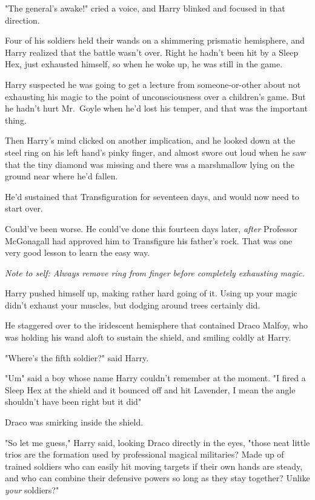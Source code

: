 "The general's awake!" cried a voice, and Harry blinked and focused in that
direction.

Four of his soldiers held their wands on a shimmering prismatic hemisphere, and
Harry realized that the battle wasn't over. Right{\el} he hadn't been hit by
a Sleep Hex, just exhausted himself, so when he woke up, he was still in the
game.

Harry suspected he was going to get a lecture from someone-or-other about not
exhausting his magic to the point of unconsciousness over a children's game.
But he hadn't hurt Mr.~Goyle when he'd lost his temper, and that was the
important thing.

Then Harry's mind clicked on another implication, and he looked down at the
steel ring on his left hand's pinky finger, and almost swore out loud when he
saw that the tiny diamond was missing and there was a marshmallow lying on the
ground near where he'd fallen.

He'd sustained that Transfiguration for seventeen days, and would now need to
start over.

Could've been worse. He could've done this fourteen days later, \emph{after}
Professor McGonagall had approved him to Transfigure his father's rock. That
was one very good lesson to learn the easy way.

\emph{Note to self: Always remove ring from finger before completely exhausting
magic.}

Harry pushed himself up, making rather hard going of it. Using up your magic
didn't exhaust your muscles, but dodging around trees certainly did.

He staggered over to the iridescent hemisphere that contained Draco Malfoy, who
was holding his wand aloft to sustain the shield, and smiling coldly at Harry.

"Where's the fifth soldier?" said Harry.

"Um{\el}" said a boy whose name Harry couldn't remember at the moment. "I
fired a Sleep Hex at the shield and it bounced off and hit Lavender, I mean the
angle shouldn't have been right but it did{\el}"

Draco was smirking inside the shield.

"So let me guess," Harry said, looking Draco directly in the eyes, "those neat
little trios are the formation used by professional magical militaries? Made up
of trained soldiers who can easily hit moving targets if their own hands are
steady, and who can combine their defensive powers so long as they stay
together? Unlike \emph{your} soldiers?"

